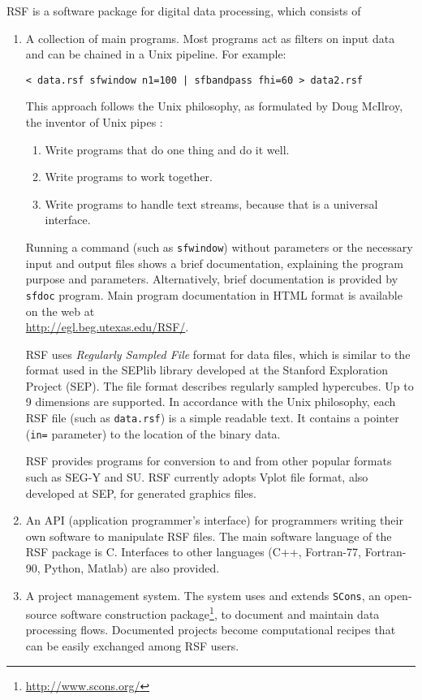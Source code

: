 RSF is a software package for digital data processing,
which consists of
\begin{enumerate}
\item A collection of main programs. Most programs act as filters on input
  data and can be chained in a Unix pipeline. For example:
\begin{verbatim}
< data.rsf sfwindow n1=100 | sfbandpass fhi=60 > data2.rsf
\end{verbatim}
This approach follows the Unix philosophy, as formulated by Doug McIlroy,
the inventor of Unix pipes \cite[]{salus}:
\begin{enumerate}
\item Write programs that do one thing and do it well. 
\item Write programs to work together. 
\item Write programs to handle text streams, because that is a universal
  interface.
\end{enumerate}

Running a command (such as \texttt{sfwindow}) without parameters or the
necessary input and output files shows a brief documentation, explaining the
program purpose and parameters.  Alternatively, brief documentation is
provided by \texttt{sfdoc} program. Main program documentation in HTML format
is available on the web at \\ \url{http://egl.beg.utexas.edu/RSF/}.

RSF uses \emph{Regularly Sampled File} format for data files, which is similar
to the format used in the SEPlib library developed at the Stanford Exploration
Project (SEP). The file format describes regularly sampled hypercubes. Up to 9
dimensions are supported. In accordance with the Unix philosophy, each RSF
file (such as \texttt{data.rsf}) is a simple readable text. It contains a
pointer (\texttt{in=} parameter) to the location of the binary data. 

RSF provides programs for conversion to and from other popular formats such as
SEG-Y and SU. RSF currently adopts Vplot file format, also developed at SEP,
for generated graphics files.

\item An API (application programmer's interface) for programmers writing
  their own software to manipulate RSF files. The main software language of
  the RSF package is C. Interfaces to other languages (C++, Fortran-77,
  Fortran-90, Python, Matlab) are also provided.
  
\item A project management system. The system uses and extends \texttt{SCons},
  an open-source software construction
  package\footnote{\url{http://www.scons.org/}}, to document and maintain data
  processing flows. Documented projects become computational recipes that can
  be easily exchanged among RSF users.
  

\end{enumerate}
